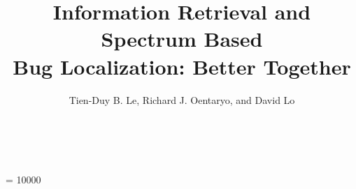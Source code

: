 \documentclass{sig-alternate}
\begin{document}
\newcommand{\nop}[1]{}
\def\concat{\mathit{+\!\!+}}
\def\ln{\hspace{0.12cm}}
\newcommand{\hide}[1]{\hspace*{-5pt}~}



\newcommand{\ie}{{\sl i.e.}}
\newcommand{\eg}{{\sl e.g.}}
\newcommand{\etc}{{\sl etc.}}

\title{ Information Retrieval and Spectrum Based\\ Bug Localization: Better Together}







\author{\alignauthor Tien-Duy B. Le, Richard J. Oentaryo, and David Lo\\
 \\
\\
}

\conferenceinfo{} {}
\CopyrightYear{}
\crdata{}
\widowpenalty = 10000

\maketitle
\sloppy
\begin{abstract}

\end{abstract}




\balance


\end{document}
